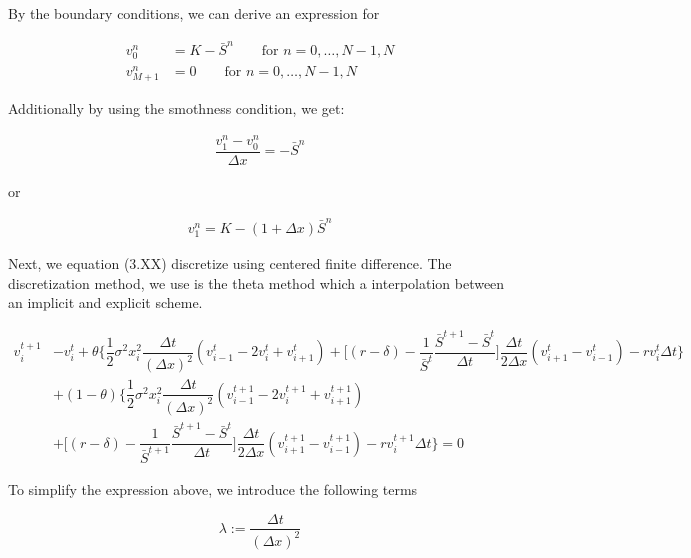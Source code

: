 By the boundary conditions, we can derive an expression for

\begin{align}
    v^{n}_{0} &= K - \bar{S}^{n} \qquad \text{for $n = 0, \dots, N - 1, N$} \\
    v^{n}_{M+1} &= 0 \qquad \text{for $n = 0, \dots, N - 1, N$}
\end{align}

Additionally by using the smothness condition, we get:

\begin{align}
    \dfrac{v^{n}_{1} - v^{n}_0}{\Delta x} = -\bar{S}^{n}
\end{align}

or 

\begin{align}
    v^{n}_{1}= K - (1 + {\Delta x})\bar{S}^{n}
\end{align}

Next, we equation (3.XX) discretize using centered finite difference. The discretization
method, we use is the theta method which a interpolation between an implicit and explicit scheme.

\begin{equation}
    \begin{split}
        v^{t+1}_{i} &- v^{t}_{i} + \theta \bigg\{ \dfrac{1}{2}\sigma^2 x^{2}_{i} \dfrac{\Delta t}{(\Delta x)^2} (v^{t}_{i-1} - 2 v^{t}_{i} + v^{t}_{i+1}) + \bigg[ (r - \delta) - \dfrac{1}{\bar{S}^t} \dfrac{\bar{S}^{t+1} - \bar{S}^{t}}{\Delta t} \bigg] \dfrac{\Delta t}{2\Delta x} (v_{i+1}^{t} - v_{i-1}^{t}) - r v^{t}_{i} \Delta t \bigg\}
        \\ & + (1-\theta) \bigg\{ \dfrac{1}{2}\sigma^2 x^{2}_{i} \dfrac{\Delta t}{(\Delta x)^2}(v^{t+1}_{i-1} - 2 v^{t+1}_{i} + v^{t+1}_{i+1}) 
        \\ &  + \bigg[ (r - \delta) - \dfrac{1}{\bar{S}^{t+1}} \dfrac{\bar{S}^{t+1} - \bar{S}^{t}}{\Delta t} \bigg]\dfrac{\Delta t}{2\Delta x}(v_{i+1}^{t+1} - v_{i-1}^{t+1}) - r v^{t+1}_{i} \Delta t \bigg\} = 0
    \end{split}
\end{equation}

To simplify the expression above, we introduce the following terms

\begin{equation}
    \lambda := \dfrac{\Delta t}{(\Delta x)^2}
\end{equation}

